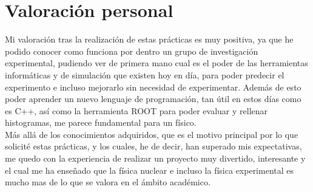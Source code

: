 \documentclass[12pt,a4paper]{article}
\numberwithin{equation}{section}
\numberwithin{figure}{section}
\begin{document}
\section{Valoración personal}

Mi valoración tras la realización de estas prácticas es muy positiva, ya que he podido conocer como funciona por dentro un grupo de investigación experimental, pudiendo ver de primera mano cual es el poder de las herramientas informáticas y de simulación que existen hoy en día, para poder predecir el experimento e incluso mejorarlo sin necesidad de experimentar. Además de esto poder aprender un nuevo lenguaje de programación, tan útil en estos días como es C++, así como la herramienta ROOT para poder evaluar y rellenar histogramas, me parece fundamental para un físico. \\

Más allá de los conocimientos adquiridos, que es el motivo principal por lo que solicité estas prácticas, y los cuales, he de decir, han superado mis expectativas, me quedo con la experiencia de realizar un proyecto muy divertido, interesante y el cual me ha enseñado que la física nuclear e incluso la física experimental es mucho mas de lo que se valora en el ámbito académico.
\end{document}
